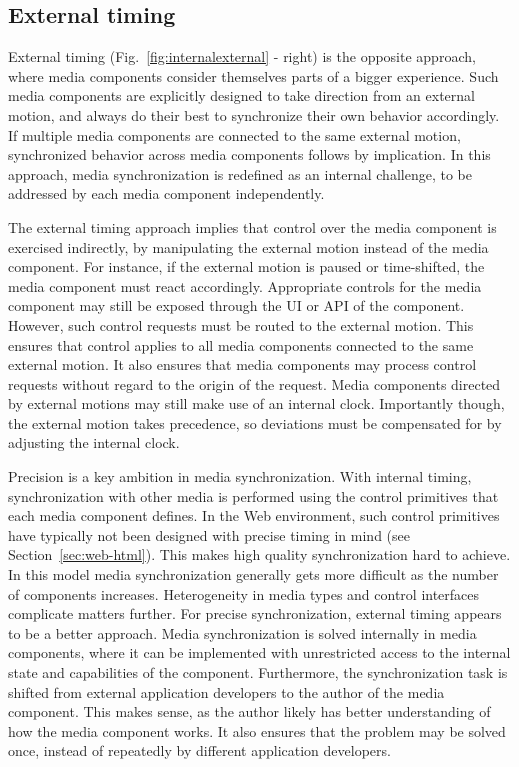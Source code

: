\subsection {External timing}

External timing (Fig.~\ref{fig:internalexternal} - right) is the opposite
approach, where media components consider themselves parts of a bigger
experience. Such media components are explicitly designed to take direction
from an external motion, and always do their best to synchronize their own
behavior accordingly. If multiple media components are connected to the same
external motion, synchronized behavior across media components follows by
implication. In this approach, media synchronization is redefined as an
internal challenge, to be addressed by each media component independently.



The external timing approach implies that control over the media component is
exercised indirectly, by manipulating the external motion instead of the media
component. For instance, if the external motion is paused or time-shifted, the
media component must react accordingly. Appropriate controls for the media
component may still be exposed through the UI or API of the component.
However, such control requests must be routed to the external motion. This
ensures that control applies to all media components connected to the same
external motion. It also ensures that media components may process control
requests without regard to the origin of the request. Media
components directed by external motions may still make use of an internal
clock. Importantly though, the external motion takes precedence, so deviations
must be compensated for by adjusting the internal clock.


Precision is a key ambition in media synchronization. With internal timing,
synchronization with other media is performed using the control primitives
that each media component defines. In the Web environment, such control
primitives have typically not been designed with precise timing in mind  (see
Section~\ref{sec:web-html}).  This makes high quality synchronization hard to
achieve. In this model media synchronization generally gets more difficult as
the number of components increases. Heterogeneity in media types and control
interfaces complicate matters further. For precise synchronization, external
timing appears to be a better approach. Media synchronization is solved
internally in media components, where it can be implemented with unrestricted
access to the internal state and capabilities of the component. Furthermore,
the synchronization task is shifted from external application developers to
the author of the media component. This makes sense, as the author likely has
better understanding of how the media component works. It also ensures that
the problem may be solved once, instead of repeatedly by different application
developers.


